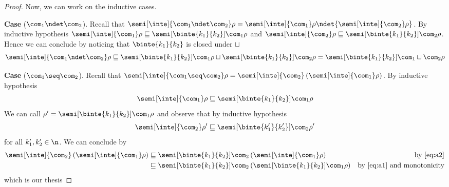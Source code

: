 \begin{proof}
  \medskip
  \noindent
  Now, we can work on the inductive cases.

  \medskip

  \noindent
  \textbf{Case} (\(\com_1 \ndet \com_2\)).
  Recall that
  \({\semi[\inte]{\com_1 \ndet \com_2}\rho} =
  {\semi[\inte]{\com_1}\rho} \ndet {\semi[\inte]{\com_2}\rho}\). By
  inductive hypothesis
  \({\semi[\inte]{\com_1}\rho} \sqsubseteq
  {\semi[\binte{k_1}{k_2}]{\com_1}\rho}\) and
  \({\semi[\inte]{\com_2}\rho} \sqsubseteq
  {\semi[\binte{k_1}{k_2}]{\com_2}\rho}\). Hence we can conclude by noticing
  that \(\binte{k_1}{k_2}\) is closed under \(\sqcup\)
  \begin{equation*}
    \semi[\inte]{\com_1 \ndet \com_2}\rho \sqsubseteq
    \semi[\binte{k_1}{k_2}]{\com_1}\rho \sqcup \semi[\binte{k_1}{k_2}]{\com_2}\rho =
    \semi[\binte{k_1}{k_2}]{\com_1 \sqcup \com_2}\rho
  \end{equation*}

  \medskip

  \noindent
  \textbf{Case} (\(\com_1 \seq \com_2\)).
  Recall that
  \({\semi[\inte]{\com_1 \seq \com_2}\rho} =
  {\semi[\inte]{\com_2}\left(\semi[\inte]{\com_1}\rho\right)}\). By
  inductive hypothesis
  \begin{equation}\label{eq:a1}
    {\semi[\inte]{\com_1}\rho} \sqsubseteq {\semi[\binte{k_1}{k_2}]{\com_1}\rho}
  \end{equation}
  We can call \(\rho' = {\semi[\binte{k_1}{k_2}]{\com_1}\rho}\) and observe
  that by inductive hypothesis
  \begin{equation}\label{eq:a2} {\semi[\inte]{\com_2}\rho'}
    \sqsubseteq {\semi[\binte{k_1'}{k_2'}]{\com_2}\rho'}
  \end{equation}
  for all \(k_1',k_2'\in\n\). We can conclude by
  \begin{align*}
    {\semi[\inte]{\com_2}\left(\semi[\inte]{\com_1}\rho\right)} & \sqsubseteq {\semi[\binte{k_1}{k_2}]{\com_2}\left(\semi[\inte]{\com_1}\rho\right)} & \text{by \eqref{eq:a2}}\\
                                                                & \sqsubseteq {\semi[\binte{k_1}{k_2}]{\com_2}\left(\semi[\binte{k_1}{k_2}]{\com_1}\rho\right)} & \text{by \eqref{eq:a1} and monotonicity}
  \end{align*}
  which is our thesis

  \medskip


\end{proof}
